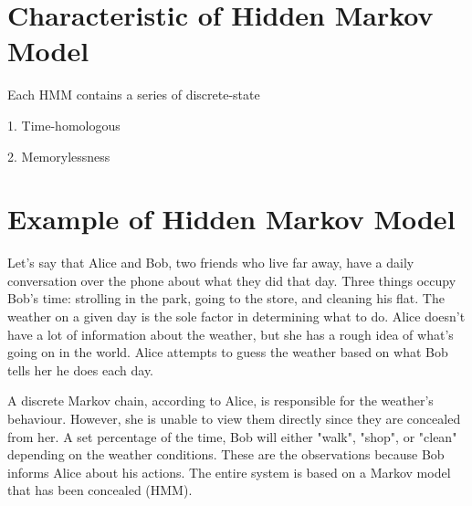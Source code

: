 \documentclass{article}
\begin{document}
\section*{Characteristic of Hidden Markov Model}

Each HMM contains a series of discrete-state

1. Time-homologous

2. Memorylessness

\section*{Example of Hidden Markov Model}
Let's say that Alice and Bob, two friends who live far away, have a daily conversation over the phone about what they did that day. Three things occupy Bob's time: strolling in the park, going to the store, and cleaning his flat. The weather on a given day is the sole factor in determining what to do. Alice doesn't have a lot of information about the weather, but she has a rough idea of what's going on in the world. Alice attempts to guess the weather based on what Bob tells her he does each day.

A discrete Markov chain, according to Alice, is responsible for the weather's behaviour. However, she is unable to view them directly since they are concealed from her. A set percentage of the time, Bob will either "walk", "shop", or "clean" depending on the weather conditions. These are the observations because Bob informs Alice about his actions. The entire system is based on a Markov model that has been concealed (HMM).
\end{document}
